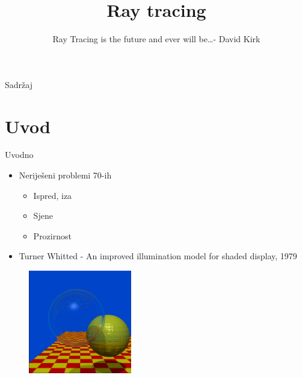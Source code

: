\documentclass[9pt]{beamer}
\title{Ray tracing}
\subtitle{Ray Tracing is the future and ever will be\ldots - David Kirk}
\institute{Računalna grafika}
\begin{document}
\begin{frame}
 \titlepage
\end{frame}

\begin{frame}{Sadržaj}
  \tableofcontents
\end{frame}
\section{Uvod}

\begin{frame}{Uvodno}
\begin{itemize}
	\item Neriješeni problemi 70-ih
	\begin{itemize}
		\item Ispred, iza
		\item Sjene
		\item Prozirnost
	\end{itemize}
	\item Turner Whitted - An improved illumination model for shaded display, 1979
\end{itemize}
\begin{figure}
	\includegraphics[width=0.4\textwidth]{./slike/whitted-spheres.jpg}
\end{figure}
\end{frame}
\end{document}
